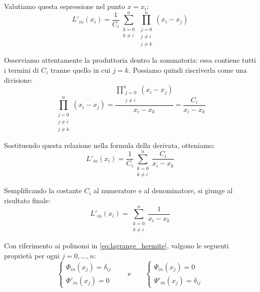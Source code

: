 Valutiamo questa espressione nel punto $x = x_i$:
$$ L'_{in}(x_i) = \frac{1}{C_i} \sum_{\substack{k=0 \\ k \neq i}}^{n} \prod_{\substack{j=0 \\ j \neq i \\ j \neq k}}^{n} (x_i - x_j) $$

Osserviamo attentamente la produttoria dentro la sommatoria: essa contiene tutti i termini di $C_i$ tranne quello in cui $j=k$. Possiamo quindi riscriverla come una divisione:
$$ \prod_{\substack{j=0 \\ j \neq i \\ j \neq k}}^{n} (x_i - x_j) = \frac{\prod_{\substack{j=0 \\ j \neq i}}^{n} (x_i - x_j)}{x_i - x_k} = \frac{C_i}{x_i - x_k} $$

Sostituendo questa relazione nella formula della derivata, otteniamo:
$$ L'_{in}(x_i) = \frac{1}{C_i} \sum_{\substack{k=0 \\ k \neq i}}^{n} \frac{C_i}{x_i - x_k} $$

Semplificando la costante $C_i$ al numeratore e al denominatore, si giunge al risultato finale:
$$ L'_{in}(x_i) = \sum_{\substack{k=0 \\ k \neq i}}^{n} \frac{1}{x_i - x_k} $$

\begin{teorema}
    Con riferimento ai polinomi in \eqref{eq:lagrange_hermite}, valgono le seguenti proprietà per ogni $j=0, \dots, n$:
    \begin{equation} \label{eq:prop_lagrange}
    \begin{cases}
    \Phi_{in}(x_j) = \delta_{ij} \\
    \Phi'_{in}(x_j) = 0
    \end{cases}
    \qquad \text{e} \qquad
    \begin{cases}
    \Psi_{in}(x_j) = 0 \\
    \Psi'_{in}(x_j) = \delta_{ij}
    \end{cases}
    \end{equation}
    \end{teorema}
    
